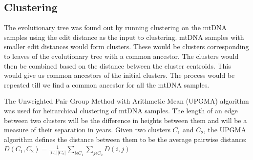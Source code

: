 \documentclass[conference]{IEEEtran}
\begin{document}
\FloatBarrier
\subsection{Clustering}
The evolutionary tree was found out by running clustering on the mtDNA samples using the edit distance as the input to clustering. mtDNA samples with smaller edit distances would form clusters. These would be clusters corresponding to leaves of the evolutionary tree with a common ancestor. The clusters would then be combined based on the distance between the cluster centroids. This would give us common ancestors of the initial clusters. The process would be repeated till we find a common ancestor for all the mtDNA samples. 

The Unweighted Pair Group Method with Arithmetic Mean (UPGMA) algorithm \cite{TextBook1} was used for heirarchical clustering of mtDNA samples. The length of an edge between two clusters will be the difference in heights between them and will be a measure of their separation in years. Given two clusters $C_1$ and $C_2$, the UPGMA algorithm defines the distance between them to be the average pairwise distance: \\

$D(C_1, C_2) =\frac{1}{\left | C_1 \right | \left | C_2 \right |} \sum_{i \epsilon C_1} \sum_{j \epsilon C_2} D\left (i, j \right )$\\
\end{document}
